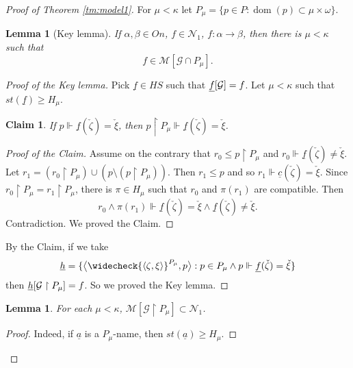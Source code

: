 \documentclass[a4paper,10pt,reqno]{amsart}
\numberwithin{equation}{section}
\newtheorem{lemma}[theorem]{Lemma}
\newtheorem{claim}{Claim}[theorem]
\theoremstyle{definition}
\theoremstyle{remark}
\newcommand{\mc}[1]{\mathcal{#1}}
\newcommand{\setm}{\setminus}
\newcommand{\subs}{\subset}
\newcommand{\dom}{\operatorname{dom}}
\def\<{\left\langle}
\def\>{\right\rangle}
\begin{document}
\begin{proof}[Proof of Theorem \ref{tm:model1}]
For ${\mu}<{\kappa}$ let 
$P_{\mu}=\{p\in P: \dom(p)\subs {\mu}\times {\omega}\}$.


\begin{lemma}[Key lemma]\label{lm:key}
If ${\alpha},{\beta}\in On$, $f\in \mc N_1$, $f:{\alpha}\to {\beta}$,
then there is ${\mu}<{\kappa}$ such that 
\begin{displaymath}
f\in \mc M[\mc G\cap P_{\mu}].
\end{displaymath}
\end{lemma}
\begin{proof}[Proof of the Key lemma]
Pick $\underline f\in HS$ such that $\KKGU f=f$.
Let ${\mu}<{\kappa}$ such that $st(\underline{f})\ge H_{\mu}$.

\begin{claim}
If $p\Vdash \underline{f}(\check{\zeta})=\check {\xi}$, then
$p\restriction P_{\mu}\Vdash \underline{f}(\check{\zeta})=\check {\xi}$. 
\end{claim}

\begin{proof}[Proof of the Claim]
    Assume on the contrary that 
    $r_0\le p\restriction P_{\mu}$ and $r_0\Vdash \underline{f}(\check {\zeta})\ne \check {\xi}$.
    Let $r_1=(r_0\restriction P_{\mu})\cup (p\setm  (p\restriction P_{\mu}))$. Then $r_1\le p$ and so 
    $r_1 \Vdash\underline{c}(\check {\zeta})=\check {\xi}$.
Since $r_0\restriction P_{\mu}=r_1\restriction P_{\mu}$,
    there is ${\pi}\in H_{\mu}$ such that $r_0$ and ${\pi}(r_1)$
    are compatible. 
    Then $$r_0\land {\pi}(r_1)\Vdash \underline{f}(\check {\zeta})=\check {\xi}
    \land \underline{f}(\check {\zeta})\ne\check{\xi}.$$
    Contradiction. We proved the Claim.
\end{proof}
By the Claim, if we take 
\begin{displaymath}
\underline{h}=\{\big\langle \widecheck{\<{\zeta},{\xi}\>}^{P_{\mu}},p\big\rangle:p\in P_{\mu}\land p\Vdash \underline{f}(\check {\zeta})=\check {\xi} \}
\end{displaymath}
then $\KK{\underline{h}}{\mc G\restriction P_{\mu}} =f$. So
we proved the Key lemma.
\end{proof}

\begin{lemma}\label{lm:zfcsubmodels}
For each ${\mu}<{\kappa}$, $\mc M[\mc G\restriction P_{\mu}]\subs \mc N_1$.
\end{lemma}

\begin{proof}
Indeed, if $\underline{a}$ is a $P_{\mu}$-name, then $st(\underline{a})\ge H_{\mu}$.
\end{proof}


\end{proof}
\end{document}
